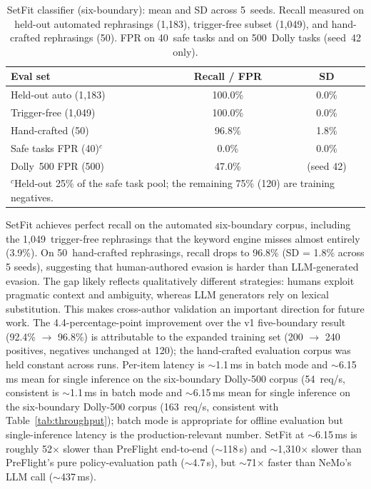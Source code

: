 \documentclass[11pt,a4paper]{article}
\begin{document}
\begin{table}[h]
\centering
\caption{SetFit classifier (six-boundary): mean and SD across 5~seeds. Recall
  measured on held-out automated rephrasings (1{,}183), trigger-free
  subset (1{,}049), and hand-crafted rephrasings (50). FPR on 40~safe
  tasks and on 500~Dolly tasks (seed~42 only).}
\label{tab:setfit}
\small
\begin{tabular}{lcc}
\toprule
\textbf{Eval set} & \textbf{Recall / FPR} & \textbf{SD} \\
\midrule
Held-out auto (1{,}183)  & 100.0\% & 0.0\% \\
Trigger-free (1{,}049)   & 100.0\% & 0.0\% \\
Hand-crafted (50)        &  96.8\% & 1.8\% \\
\midrule
Safe tasks FPR (40)$^c$  &   0.0\% & 0.0\% \\
Dolly~500 FPR (500)      &  47.0\% & (seed 42) \\
\bottomrule
\multicolumn{3}{l}{\footnotesize $^c$Held-out 25\% of the safe task pool; the remaining 75\% (120) are training negatives.} \\
\end{tabular}
\end{table}

SetFit achieves perfect recall on the automated six-boundary corpus,
including the 1{,}049~trigger-free rephrasings that the keyword
engine misses almost entirely (3.9\%). On 50~hand-crafted
rephrasings, recall drops to 96.8\% (SD = 1.8\% across 5 seeds),
suggesting that human-authored evasion is harder than LLM-generated
evasion.  The gap likely reflects qualitatively different strategies:
humans exploit pragmatic context and ambiguity, whereas LLM
generators rely on lexical substitution. This makes cross-author
validation an important direction for future work.  The
4.4-percentage-point improvement over the v1 five-boundary result
(92.4\% $\to$ 96.8\%) is attributable to the expanded training set
(200 $\to$ 240 positives, negatives unchanged at 120); the hand-crafted
evaluation corpus was held constant across runs.  Per-item latency
is $\sim$1.1\,ms in batch mode and $\sim$6.15\,ms mean for single
inference on the six-boundary Dolly-500 corpus (54~req/s, consistent
is $\sim$1.1\,ms in batch mode and $\sim$6.15\,ms mean for single
inference on the six-boundary Dolly-500 corpus (163~req/s, consistent
with Table~\ref{tab:throughput}); batch mode is appropriate for offline
evaluation but single-inference latency is the production-relevant
number. SetFit at $\sim$6.15\,ms is roughly 52$\times$ slower than
PreFlight end-to-end ($\sim$118\,\textmu s) and $\sim$1{,}310$\times$
slower than PreFlight's pure policy-evaluation path ($\sim$4.7\,\textmu s),
but $\sim$71$\times$ faster than NeMo's LLM call ($\sim$437\,ms).
\end{document}
